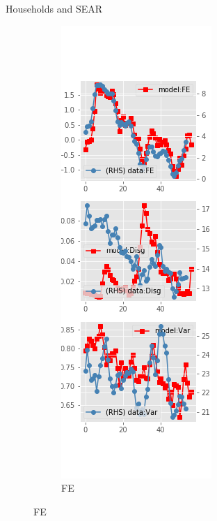 \documentclass{beamer}
\begin{document}
\begin{frame}{Households and SEAR}
	\begin{figure}[ht]
		\label{SE_diag_SCE}
		\begin{subfigure}[b]{0.2\textwidth}
			\centering
			\caption{FE}
			\includegraphics[width=\textwidth, height = 0.8\textheight]{figuresDraft/sce_se_est_diag0.png}

\end{subfigure}
\end{figure}
\end{frame}
\end{document}
